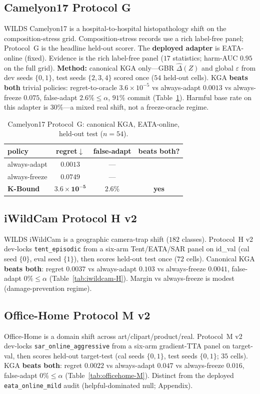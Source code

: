 \documentclass[11pt]{article}
\theoremstyle{plain}
\theoremstyle{definition}
\theoremstyle{remark}
\begin{document}
\subsection{Camelyon17 Protocol G}
WILDS Camelyon17 is a hospital-to-hospital histopathology shift on the composition-stress
grid. Composition-stress records use a rich label-free panel; Protocol~G is the headline
held-out scorer. The \textbf{deployed adapter}
is EATA-online (fixed). Evidence is the rich label-free panel ($17$ statistics;
harm-AUC $0.95$ on the full grid). \textbf{Method:} canonical \textsc{KGA} only---GBR
$\widehat\Delta(Z)$ and global $\varepsilon$ from dev seeds $\{0,1\}$, test seeds
$\{2,3,4\}$ scored once ($54$ held-out cells). \textsc{KGA} \textbf{beats both}
trivial policies: regret-to-oracle $3.6{\times}10^{-5}$ vs always-adapt $0.0013$ vs always-freeze
$0.075$, false-adapt $2.6\%\le\alpha$, $91\%$ commit (Table~\ref{tab:camelyon17-G}). Harmful
base rate on this adapter is $30\%$---a mixed real shift, not a freeze-oracle regime.

\begin{table}[t]\centering\small
\caption{Camelyon17 Protocol~G: canonical \textsc{KGA}, EATA-online, held-out test ($n{=}54$).}
\label{tab:camelyon17-G}
\begin{tabular}{lccc}
\toprule
policy & regret$\downarrow$ & false-adapt & beats both? \\
\midrule
always-adapt  & $0.0013$ & --- & \\
always-freeze & $0.0749$ & --- & \\
\textbf{K-Bound} & $\mathbf{3.6{\times}10^{-5}}$ & $2.6\%$ & \textbf{yes} \\
\bottomrule
\end{tabular}
\end{table}

\subsection{iWildCam Protocol H v2}
WILDS iWildCam is a geographic camera-trap shift ($182$ classes). Protocol~H v2 dev-locks
\texttt{tent\_episodic} from a six-arm Tent/EATA/SAR panel on id\_val (cal seed $\{0\}$,
eval seed $\{1\}$), then scores held-out test once ($72$ cells). Canonical \textsc{KGA}
\textbf{beats both}: regret $0.0037$ vs always-adapt $0.103$ vs always-freeze $0.0041$,
false-adapt $0\%\le\alpha$ (Table~\ref{tab:iwildcam-H}). Margin vs always-freeze is modest
(damage-prevention regime).

\subsection{Office-Home Protocol M v2}
Office-Home is a domain shift across art/clipart/product/real. Protocol~M v2 dev-locks
\texttt{sar\_online\_aggressive} from a six-arm gradient-TTA panel on target-val, then scores
held-out target-test (cal seeds $\{0,1\}$, test seeds $\{0,1\}$; $35$ cells). \textsc{KGA}
\textbf{beats both}: regret $0.0022$ vs always-adapt $0.047$ vs always-freeze $0.016$,
false-adapt $0\%\le\alpha$ (Table~\ref{tab:officehome-M}). Distinct from the deployed
\texttt{eata\_online\_mild} audit (helpful-dominated null; Appendix).
\end{document}
